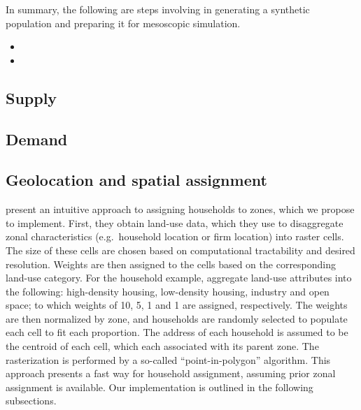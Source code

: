 \documentclass[11pt,twoside]{article}
\numberwithin{equation}{section}
\newcommand{\?}{\stackrel{?}{=}}
\begin{document}
In summary, the following are steps involving in generating a synthetic population and preparing it for mesoscopic simulation.
\begin{itemize}
\item 
\item 
\end{itemize}

\subsection{Supply}

\subsection{Demand}



\subsection{Geolocation and spatial assignment}
\textcite{moekel2003microsimulation} present an intuitive approach to assigning households to zones, which we propose to implement.
First, they obtain land-use data, which they use to disaggregate zonal characteristics (e.g.\ household location or firm location) into raster cells.
The size of these cells are chosen based on computational tractability and desired resolution.
Weights are then assigned to the cells based on the corresponding land-use category.
For the household example, \textcite{moekel2003microsimulation} aggregate land-use attributes into the following: high-density housing, low-density housing, industry and open space;
to which weights of 10, 5, 1 and 1 are assigned, respectively.
The weights are then normalized by zone, and households are randomly selected to populate each cell to fit each proportion.
The address of each household is assumed to be the centroid of each cell, which each associated with its parent zone.
The rasterization is performed by a so-called ``point-in-polygon'' algorithm.
This approach presents a fast way for household assignment, assuming prior zonal assignment is available.
Our implementation is outlined in the following subsections.
\end{document}
